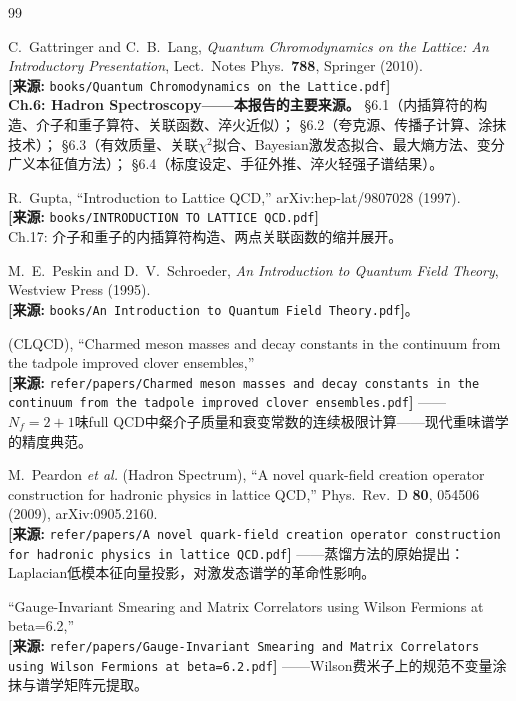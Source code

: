 \documentclass[12pt,a4paper]{ctexart}
\theoremstyle{definition}
\begin{document}
\begin{thebibliography}{99}

C.~Gattringer and C.~B.~Lang,
\textit{Quantum Chromodynamics on the Lattice: An Introductory Presentation},
Lect.\ Notes Phys.\ \textbf{788}, Springer (2010).
\\\textbf{[来源:} \texttt{books/Quantum Chromodynamics on the Lattice.pdf}\textbf{]}
\\\textbf{Ch.6: Hadron Spectroscopy——本报告的主要来源。}
§6.1（内插算符的构造、介子和重子算符、关联函数、淬火近似）；
§6.2（夸克源、传播子计算、涂抹技术）；
§6.3（有效质量、关联$\chi^2$拟合、Bayesian激发态拟合、最大熵方法、变分广义本征值方法）；
§6.4（标度设定、手征外推、淬火轻强子谱结果）。

R.~Gupta,
``Introduction to Lattice QCD,''
arXiv:hep-lat/9807028 (1997).
\\\textbf{[来源:} \texttt{books/INTRODUCTION TO LATTICE QCD.pdf}\textbf{]}
\\Ch.17: 介子和重子的内插算符构造、两点关联函数的缩并展开。

M.~E.~Peskin and D.~V.~Schroeder,
\textit{An Introduction to Quantum Field Theory}, Westview Press (1995).
\\\textbf{[来源:} \texttt{books/An Introduction to Quantum Field Theory.pdf}\textbf{]}。

(CLQCD),
``Charmed meson masses and decay constants in the continuum from the tadpole improved clover ensembles,''
\\\textbf{[来源:} \texttt{refer/papers/Charmed meson masses and decay constants in the continuum from the tadpole improved clover ensembles.pdf}\textbf{]}
——$N_f=2+1$味full QCD中粲介子质量和衰变常数的连续极限计算——现代重味谱学的精度典范。

M.~Peardon \textit{et al.} (Hadron Spectrum),
``A novel quark-field creation operator construction for hadronic physics in lattice QCD,''
Phys.\ Rev.\ D \textbf{80}, 054506 (2009), arXiv:0905.2160.
\\\textbf{[来源:} \texttt{refer/papers/A novel quark-field creation operator construction for hadronic physics in lattice QCD.pdf}\textbf{]}
——蒸馏方法的原始提出：Laplacian低模本征向量投影，对激发态谱学的革命性影响。

``Gauge-Invariant Smearing and Matrix Correlators using Wilson Fermions at beta=6.2,''
\\\textbf{[来源:} \texttt{refer/papers/Gauge-Invariant Smearing and Matrix Correlators using Wilson Fermions at beta=6.2.pdf}\textbf{]}
——Wilson费米子上的规范不变量涂抹与谱学矩阵元提取。


\end{thebibliography}
\end{document}

